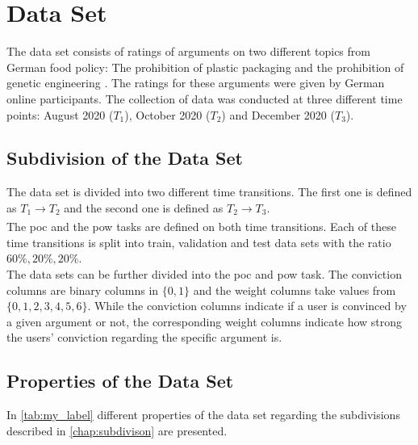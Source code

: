 \section{Data Set}
The data set consists of ratings of arguments on two different topics from German food policy: The prohibition of plastic packaging and the prohibition of genetic engineering \cite{brenneis2021will}. The ratings for these arguments were given by German online participants. The collection of data was conducted at three different time points: August 2020 ($T_1$), October 2020 ($T_2$) and December 2020 ($T_3$). 

\subsection{Subdivision of the Data Set}
\label{chap:subdivison}
The data set is divided into two different time transitions. The first one is defined as $T_1 \xrightarrow[]{} T_2$ and the second one is defined as $T_2 \xrightarrow[]{} T_3$.\\
The \acrshort{poc} and the \acrshort{pow} tasks are defined on both time transitions.
Each of these time transitions is split into train, validation and test data sets with the ratio $60\%, 20\%, 20\%$. \\
The data sets can be further divided into the \acrshort{poc} and \acrshort{pow} task. The conviction columns are binary columns in $\{0,1\}$ and the weight columns take values from $\{0,1,2,3,4,5,6\}$. While the conviction columns indicate if a user is convinced by a given argument or not, the corresponding weight columns indicate how strong the users' conviction regarding the specific argument is.

\subsection{Properties of the Data Set}
In \autoref{tab:my_label} different properties of the data set regarding the subdivisions described in \autoref{chap:subdivison} are presented.

